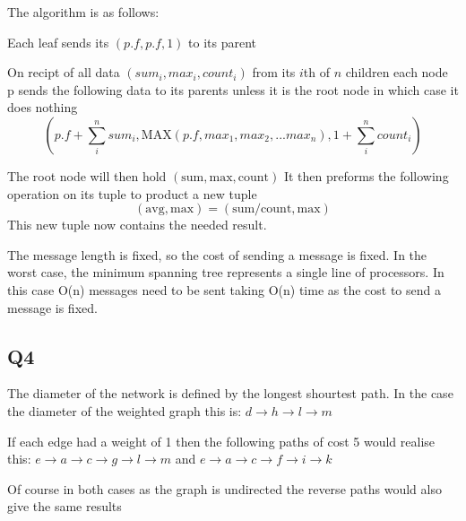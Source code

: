 \documentclass[11pt]{article}
\begin{document}
The algorithm is as follows:

Each leaf sends its $(p.f, p.f, 1)$ to its parent

On recipt of all data $(sum_i, max_i, count_i)$ from its $i$th of $n$ children each node p sends the following data to its parents unless it is the root node in which case it does nothing
$$(p.f + \sum_i^n sum_i, \text{MAX}(p.f, max_1, max_2, ... max_n), 1 + \sum_i^n count_i)$$

The root node will then hold $(\text{sum}, \text{max}, \text{count})$
It then preforms the following operation on its tuple to product a new tuple 
$$(\text{avg}, \text{max}) = (\text{sum/count}, \text{max})$$
This new tuple now contains the needed result.

The message length is fixed, so the cost of sending a message is fixed.
In the worst case, the minimum spanning tree represents a single line of processors.
In this case O(n) messages need to be sent taking O(n) time as the cost to send a message is fixed.

\subsection*{Q4}
The diameter of the network is defined by the longest shourtest path. In the case
the diameter of the weighted graph this is:
$d \rightarrow h \rightarrow l \rightarrow m$

If each edge had a weight of 1 then the following paths of cost 5 would realise this:
$ e \rightarrow a \rightarrow c \rightarrow g \rightarrow l \rightarrow m$ and
$e \rightarrow a \rightarrow c \rightarrow f \rightarrow i \rightarrow k$

Of course in both cases as the graph is undirected the reverse paths would also give the same results
\end{document}

